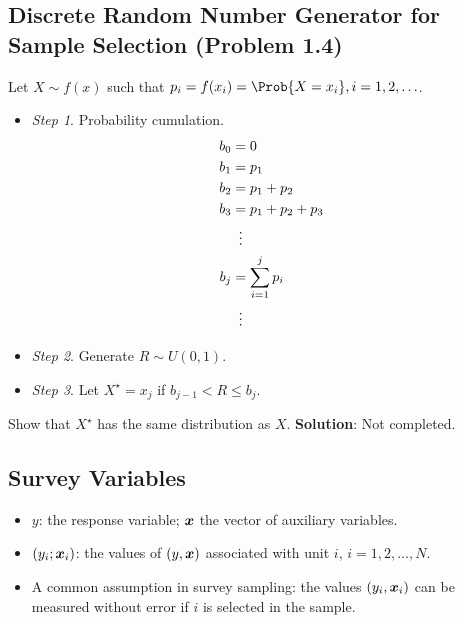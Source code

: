 \subsection*{Discrete Random Number Generator for Sample Selection (Problem 1.4)}
\begin{Example}{}
      Let $ X \sim f(x) $ such that $p_i=f(x_i)=\Prob{X=x_i},i=1,2,\ldots$.
      \begin{itemize}
            \item \emph{Step 1}. Probability cumulation.
                  \begin{align*}
                        b_0 & =0                 \\
                        b_1 & =p_1               \\
                        b_2 & =p_1+p_2           \\
                        b_3 & =p_1+p_2+p_3       \\
                            & \vdotswithin{=}    \\
                        b_j & =\sum_{i=1}^{j}p_i \\
                            & \vdotswithin{=}
                  \end{align*}
            \item \emph{Step 2}. Generate $ R\sim U(0,1) $.
            \item \emph{Step 3}. Let $ X^\star=x_j $ if $ b_{j-1}<R\le b_j $.
      \end{itemize}
      Show that $ X^\star $ has the same distribution as $ X $.
      \tcblower{}
      \textbf{Solution}: Not completed.
\end{Example}
\subsection*{Survey Variables}
\begin{Regular}{}
      \begin{itemize}
            \item $ y $: the response variable; $ \bm{x} $
                  the vector of auxiliary variables.
            \item $ (y_i;\bm{x}_i) $: the values of $ (y,\bm{x}) $
                  associated with unit $ i $, $ i=1,2,\ldots,N $.
            \item A common assumption in survey sampling: the values $ (y_i,\bm{x}_i) $
                  can be measured without error if $ i $ is selected in the sample.
      \end{itemize}
\end{Regular}
